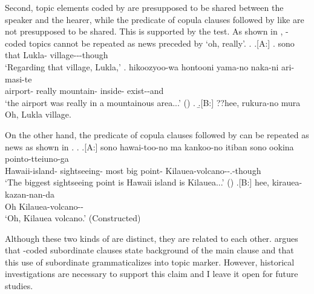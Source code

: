 Second,
topic elements coded by  are presupposed to be shared between the speaker and the hearer,
while the predicate of copula clauses followed by  like \Last are not presupposed to be shared.
This is supported by the  test.
As shown in \Next, -coded topics cannot be repeated as news preceded by  `oh, really'.
%
\ex. \a.[A:]
 \ag. sono   \\
   that Lukla- village---though \\
   `Regarding that village, Lukla,'
  \bg. hikoozyoo-wa hontooni yama-no naka-ni ari-masi-te \\
    airport- really mountain- inside- exist--and \\
    `the airport was really in a mountainous area...'
    \hfill{()}
   \z.
   \b.[B:] ??hee, rukura-no mura \\
     Oh, Lukla village.
%

On the other hand,
the predicate of copula clauses followed by  can be repeated as news as shown in \Next.
%
\ex. \ag.[A:] sono hawai-too-no ma kankoo-no itiban sono ookina pointo-tteiuno-ga  \\
		 Hawaii-island-  sightseeing- most  big point- Kilauea-volcano--.-though \\
		`The biggest sightseeing point is Hawaii island is Kilauea...'
		\hfill{()}
	\bg.[B:] hee, kirauea-kazan-nan-da \\
	  Oh Kilauea-volcano--  \\
	  `Oh, Kilauea volcano.'
	  \hfill{(Constructed)}


Although these two kinds of  are distinct,
they are related to each other.
 argues that
-coded subordinate clauses state background of the main clause and
that this use of subordinate  grammaticalizes into topic marker.
However, historical investigations are necessary to support this claim
and I leave it open for future studies.

